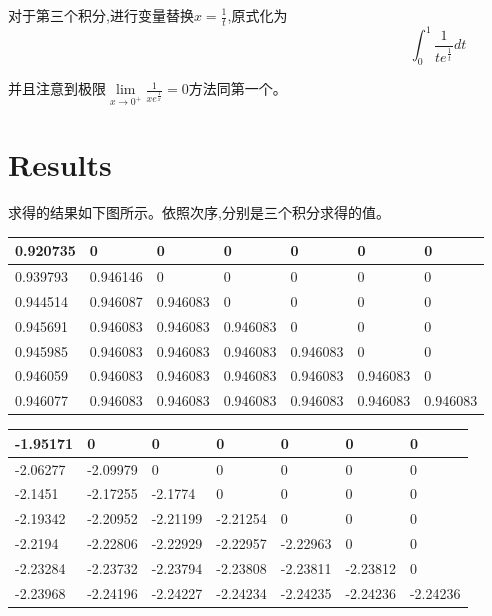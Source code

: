 \documentclass{article}
\begin{document}
	对于第三个积分,进行变量替换$x=\frac{1}{t}$,原式化为
	$$ \int_{0}^{1}\frac{1}{te^{\frac{1}{t}}}dt$$
	
    并且注意到极限$\lim\limits_{x\to 0^{+}}\frac{1}{xe^{\frac{1}{x}}}=0$方法同第一个。
	
	
	\section{Results}
	
	求得的结果如下图所示。依照次序,分别是三个积分求得的值。
	
	\begin{table}[H]
		\centering
		\begin{tabular}{|l|l|l|l|l|l|l|}
			\hline
			0.920735 & 0 & 0 & 0 & 0 & 0 & 0 \\ \hline
			0.939793 & 0.946146 & 0 & 0 & 0 & 0 & 0 \\ \hline
			0.944514 & 0.946087 & 0.946083 & 0 & 0 & 0 & 0 \\ \hline
			0.945691 & 0.946083 & 0.946083 & 0.946083 & 0 & 0 & 0 \\ \hline
			0.945985 & 0.946083 & 0.946083 & 0.946083 & 0.946083 & 0 & 0 \\ \hline
			0.946059 & 0.946083 & 0.946083 & 0.946083 & 0.946083 & 0.946083 & 0 \\ \hline
			0.946077 & 0.946083 & 0.946083 & 0.946083 & 0.946083 & 0.946083 & 0.946083 \\ \hline
		\end{tabular}
	\end{table}
	
	\begin{table}[H]
		\centering
		\begin{tabular}{|l|l|l|l|l|l|l|}
			\hline
			-1.95171 & 0 & 0 & 0 & 0 & 0 & 0 \\ \hline
			-2.06277 & -2.09979 & 0 & 0 & 0 & 0 & 0 \\ \hline
			-2.1451 & -2.17255 & -2.1774 & 0 & 0 & 0 & 0 \\ \hline
			-2.19342 & -2.20952 & -2.21199 & -2.21254 & 0 & 0 & 0 \\ \hline
			-2.2194 & -2.22806 & -2.22929 & -2.22957 & -2.22963 & 0 & 0 \\ \hline
			-2.23284 & -2.23732 & -2.23794 & -2.23808 & -2.23811 & -2.23812 & 0 \\ \hline
			-2.23968 & -2.24196 & -2.24227 & -2.24234 & -2.24235 & -2.24236 & -2.24236 \\ \hline
		\end{tabular}
	\end{table}
\end{document}
